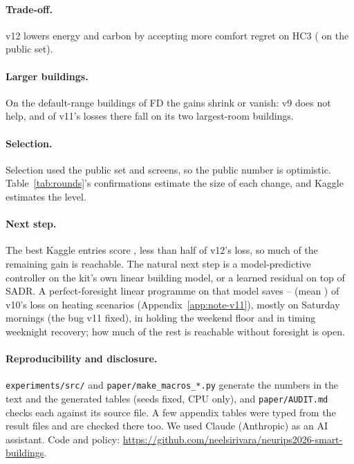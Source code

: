 \documentclass{article}
\begin{document}
\paragraph{Trade-off.} v12 lowers energy and carbon by accepting \RTenComfRiseHCThree{} more comfort regret on HC3 (\RTenComfRisePub{} on the public set).

\paragraph{Larger buildings.} On the default-range buildings of FD the gains shrink or vanish: v9 does not help, and \RNineFDTopTwoLosses{} of v11's \RNineConfFreshDefLosses{} losses there fall on its two largest-room buildings.

\paragraph{Selection.} Selection used the public set and screens, so the public number is optimistic. Table~\ref{tab:rounds}'s confirmations estimate the size of each change, and Kaggle estimates the level.

\paragraph{Next step.} The best Kaggle entries score \RElvKagBest{}, less than half of v12's loss, so much of the remaining gain is reachable. The natural next step is a model-predictive controller on the kit's own linear building model, or a learned residual on top of SADR. A perfect-foresight linear programme on that model saves \RElvLpMin--\RElvLpMax{} (mean \RElvLpMean) of v10's loss on \RElvLpN{} heating scenarios (Appendix~\ref{app:note-v11}), mostly on Saturday mornings (the bug v11 fixed), in holding the weekend floor and in timing weeknight recovery; how much of the rest is reachable without foresight is open.

\paragraph{Reproducibility and disclosure.} \texttt{experiments/src/} and \texttt{paper/make\_macros\_*.py} generate the numbers in the text and the generated tables (seeds fixed, CPU only), and \texttt{paper/AUDIT.md} checks each against its source file. A few appendix tables were typed from the result files and are checked there too. We used Claude (Anthropic) as an AI assistant. Code and policy: \url{https://github.com/neelsirivara/neurips2026-smart-buildings}.


\end{document}
